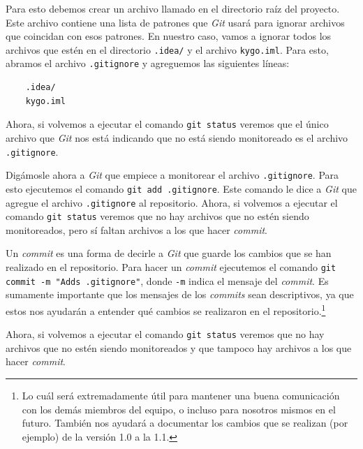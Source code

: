   Para esto debemos crear un archivo llamado  en el directorio raíz del 
  proyecto.
  Este archivo contiene una lista de patrones que \textit{Git} usará para ignorar archivos
  que coincidan con esos patrones.
  En nuestro caso, vamos a ignorar todos los archivos que estén en el directorio \texttt{.idea/} y
  el archivo \texttt{kygo.iml}.
  Para esto, abramos el archivo \texttt{.gitignore} y agreguemos las siguientes líneas:

  \begin{verbatim}
    .idea/
    kygo.iml
  \end{verbatim}

  Ahora, si volvemos a ejecutar el comando \texttt{git status} veremos que el único archivo que
  \textit{Git} nos está indicando que no está siendo monitoreado es el archivo \texttt{.gitignore}.

  Digámosle ahora a \textit{Git} que empiece a monitorear el archivo \texttt{.gitignore}.
  Para esto ejecutemos el comando \texttt{git add .gitignore}.
  Este comando le dice a \textit{Git} que agregue el archivo \texttt{.gitignore} al repositorio.
  Ahora, si volvemos a ejecutar el comando \texttt{git status} veremos que no hay archivos que
  no estén siendo monitoreados, pero sí faltan archivos a los que hacer \textit{commit}.

  Un \textit{commit} es una forma de decirle a \textit{Git} que guarde los cambios que se han
  realizado en el repositorio.
  Para hacer un \textit{commit} ejecutemos el comando 
  \texttt{git commit -m "Adds .gitignore"}, donde \texttt{-m} 
  indica el mensaje del \textit{commit}.
  Es sumamente importante que los mensajes de los \textit{commits} sean descriptivos, ya que
  estos nos ayudarán a entender qué cambios se realizaron en el repositorio.\footnote{
    Lo cuál será extremadamente útil para mantener una buena comunicación con los demás
    miembros del equipo, o incluso para nosotros mismos en el futuro.
    También nos ayudará a documentar los cambios que se realizan (por ejemplo) de la versión
    1.0 a la 1.1.
  }

  Ahora, si volvemos a ejecutar el comando \texttt{git status} veremos que no hay archivos que
  no estén siendo monitoreados y que tampoco hay archivos a los que hacer \textit{commit}.
